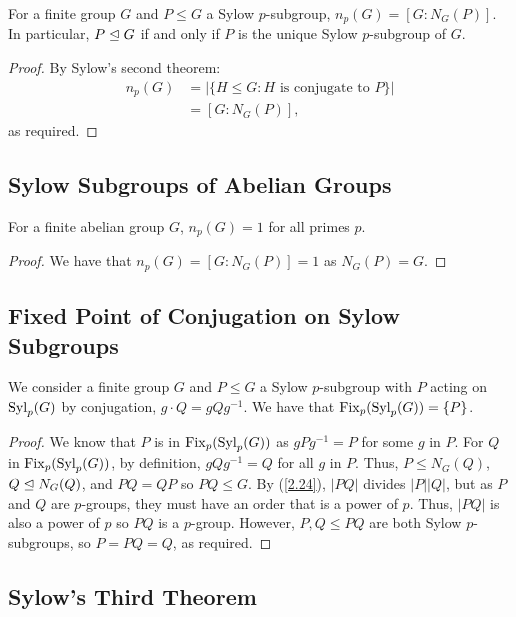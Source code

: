 For a finite group $G$ and $P \leq G$ a Sylow $p$-subgroup,
$n_p(G) = [G : N_G(P)]$. In particular, $P \trianglelefteq G$ if and
only if $P$ is the unique Sylow $p$-subgroup of $G$.

\begin{proof}
    By Sylow's second theorem: \begin{align*}
        n_p(G) &= |\{H \leq G : H \text{ is conjugate to } P\}| \\
        &= [G : N_G(P)],
    \end{align*} as required.
\end{proof}

\subsection{Sylow Subgroups of Abelian Groups} \label{6.9}

For a finite abelian group $G$, $n_p(G) = 1$ for all primes $p$.

\begin{proof}
    We have that $n_p(G) = [G : N_G(P)] = 1$ as $N_G(P) = G$.
\end{proof}

\subsection{Fixed Point of Conjugation on Sylow Subgroups} \label{6.11}

We consider a finite group $G$ and $P \leq G$ a Sylow $p$-subgroup
with $P$ acting on $\operatorname{Syl}_p(G)$ by conjugation,
$g \cdot Q = gQg^{-1}$. We have that $\operatorname{Fix}_p(\operatorname{Syl}_p(G)) = \{P\}$.

\begin{proof}
    We know that $P$ is in $\operatorname{Fix}_p(\operatorname{Syl}_p(G))$ as $gPg^{-1} = P$
    for some $g$ in $P$. For $Q$ in $\operatorname{Fix}_p(\operatorname{Syl}_p(G))$,
    by definition, $gQg^{-1} = Q$ for all $g$ in $P$. Thus,
    $P \leq N_G(Q)$, $Q \trianglelefteq N_G(Q)$, and $PQ = QP$ so
    $PQ \leq G$. By (\ref{2.24}), $|PQ|$ divides $|P||Q|$,
    but as $P$ and $Q$ are $p$-groups, they must have an order
    that is a power of $p$. Thus, $|PQ|$ is also a power of $p$
    so $PQ$ is a $p$-group. However, $P, Q \leq PQ$ are both
    Sylow $p$-subgroups, so $P = PQ = Q$, as required.
\end{proof}

\subsection{Sylow's Third Theorem} \label{6.10}

